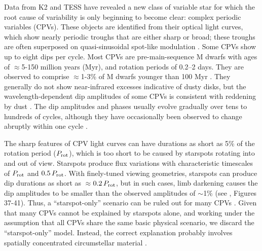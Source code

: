 \documentclass[11pt,twocolumn,tighten]{aastex63}
\begin{document}
Data from K2 \citep{2014PASP..126..398H} and TESS
\citep{2015JATIS...1a4003R} have revealed a new class of variable star
for which the root cause of variability is only beginning to become
clear: complex periodic variables (CPVs).  These objects are
identified from their optical light curves, which show nearly periodic
troughs that are either sharp or broad; these troughs are often
superposed on quasi-sinusoidal spot-like modulation
\citep{2017AJ....153..152S,2018AJ....155...63S,2019ApJ...876..127Z}.
Some CPVs show up to eight dips per cycle.  Most CPVs are
pre-main-sequence M dwarfs with ages of $\approx$5-150 million years
(Myr), and rotation periods of 0.2--2 days.  They are observed to
comprise $\approx$1-3\% of M dwarfs younger than 100 Myr
\citep{2016AJ....152..114R,2022AJ....163..144G}.  They generally do
not show near-infrared excesses indicative of dusty disks, but the
wavelength-dependent dip amplitudes of some CPVs is consistent with
reddening by dust
\citep{2017PASJ...69L...2O,2020AJ....160...86B,2022AJ....163..144G,2023MNRAS.518.2921K}.
The dip amplitudes and phases usually evolve gradually over tens to
hundreds of cycles, although they have occasionally been observed to
change abruptly within one cycle
\citep[e.g.][]{2017AJ....153..152S,2022ApJ...925...75P,2023ApJ...945..114P}.

The sharp features of CPV light curves can have durations as short as
5\% of the rotation period ($P_{\rm rot}$), which is too short to be
caused by starspots rotating into and out of view.  Starspots produce
flux variations with characteristic timescales of $P_{\rm rot}$ and
$0.5\,P_{\rm rot}$.  With finely-tuned viewing geometries, starspots
can produce dip durations as short as $\approx$$0.2\,P_{\rm rot}$, but
in such cases, limb darkening causes the dip amplitudes to be smaller
than the observed amplitudes of $\sim$1\% (see
\citealt{2017AJ....153..152S}, Figures 37-41).  Thus, a
``starspot-only'' scenario can be ruled out for many CPVs
\citep{2017AJ....153..152S,2019ApJ...876..127Z,2021MNRAS.500.1366K}.
Given that many CPVs cannot be explained by starspots alone, and
working under the assumption that all CPVs share the same basic
physical scenario, we discard the ``starspot-only'' model.
Instead, the correct explanation probably involves spatially
concentrated circumstellar material
\citep[e.g.][]{2017AJ....153..152S,2022AJ....163..144G}.
\end{document}

